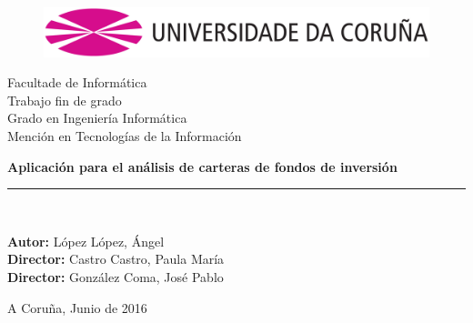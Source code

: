 \documentclass[12pt, a4paper]{book}
\newcommand*\parttitle{}
\let\origpart\part
\renewcommand*{\part}[2][]{%
	\ifx\\#1\\%
	\origpart{#2}%
	\renewcommand*\parttitle{#2}%
	\else
	\origpart[#1]{#2}%
	\renewcommand*\parttitle{#1}%
	\fi
}
\begin{document}
\renewcommand{\partname}{Capítulo}
\renewcommand{\tablename}{Tabla}
\renewcommand{\acronymname }{Acrónimos}
\let\Oldpart\part


\begin{titlepage}

\begin{center}
\vspace*{-0.2in}
\begin{figure}[htb]
\begin{center}
\includegraphics[width=12cm]{figuras/logo.png}
\end{center}
\end{figure}
\vspace*{0.6in}
{\Large Facultade de Informática}\\[1.25cm]
\vspace*{0.15in}
{\LARGE Trabajo fin de grado}\\[0.75cm]
{\LARGE  Grado en Ingeniería Informática}\\[0.5cm]
{Mención en Tecnologías de la Información }\\[1.25cm]
\vspace*{0.6in}
\vspace*{0.2in}
\begin{Large}
\textbf{Aplicación para el análisis de carteras de fondos de inversión} \\
\end{Large}
\vspace*{2in}
\vspace*{0.3in}
\rule{80mm}{0.1mm}\\
\vspace*{0.1in}
\begin{large}
\textbf{Autor:} López López, Ángel\\
\textbf{Director:} Castro Castro, Paula María\\
\textbf{Director:} González Coma, José Pablo \\
\end{large}
\vspace*{0.3in}
A Coruña, Junio de 2016
\end{center}

\end{titlepage}
\end{document}
